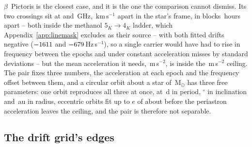 $\beta$~Pictoris is the closest case, and it is the one the comparison
cannot dismiss. Its two crossings sit at \TjBpNuLo{}
and \TjBpNuHi\,GHz, \TjBpDvKms\,km\,s$^{-1}$ apart in the star's frame, in
blocks \TjBpDtH\,hours apart -- both inside the methanol $5_K\to4_K$ ladder,
which Appendix~\ref{app:linemask} excludes as their source -- with both
fitted drifts negative
($-1611$ and $-679$\,Hz\,s$^{-1}$), so a single carrier would
have had to rise in frequency between the epochs and under constant
acceleration misses by \TjBpNSig{} standard deviations -- but the mean
acceleration it needs, \TjBpAccelReq\,m\,s$^{-2}$, is inside the
\WdAGrid\,m\,s$^{-2}$ ceiling. The pair fixes three numbers, the
acceleration at each epoch and the frequency offset between them, and a
circular orbit about a star of \EcMassBp\,M$_\odot$ \citep{Crifo1997} has
three free parameters: one orbit reproduces all three at once, at
\ObDayBp\,d in period, \ObIncBp$^\circ$ in inclination and \ObAuBp\,au in
radius, eccentric orbits fit up to $e$ of about \ObEccMaxBp{} before the
periastron acceleration leaves the ceiling, and the pair is therefore not
separable.

\begin{table}
\caption{The \WdNExc{} above-trigger readings of the widened recurrence
window, taken to the pairs of Table~\ref{tab:pairs}; each block of rows is
the one above with one effect removed.}
\label{tab:pairacct}
\footnotesize

\end{table}

\subsection{The drift grid's edges}
\label{sec:edge}

